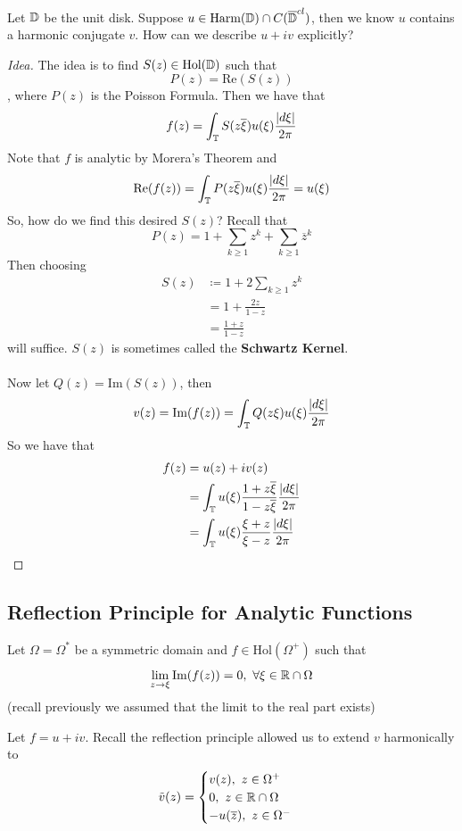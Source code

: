\documentclass{article}
\begin{document}
\begin{question}
    Let $\mathbb{D}$ be the unit disk. Suppose $u \in \text{Harm}(\mathbb{D}) \cap C(\overline{\mathbb{D}}^{cl})$, then we know $u$ contains a harmonic conjugate $v$. How can we describe $u + iv$ explicitly?
\end{question}

\begin{proof}[Idea]
The idea is to find $S(z) \in \text{Hol}(\mathbb{D})$ such that
\[P(z) = \text{Re}(S(z))\]
, where $P(z)$ is the Poisson Formula. Then we have that
\[f(z) = \int_{\mathbb{T}} S(z \overline{\xi}) u(\xi) \frac{|d\xi|}{2\pi}\]
Note that $f$ is analytic by Morera's Theorem and
\[\text{Re}(f(z)) = \int_{\mathbb{T}} P(z \overline{\xi}) u(\xi) \frac{|d\xi|}{2\pi} = u(\xi)\]
So, how do we find this desired $S(z)$? Recall that
\[P(z) = 1 + \sum_{k \geq 1} z^k + \sum_{k \geq 1} \overline{z}^k\]
Then choosing
\begin{align*}
    S(z) &\coloneqq 1 + 2 \sum_{k \geq 1} z^k\\
    &= 1 + \frac{2z}{1 - z} \tag*{Domain of $S(z)$ is $\Dbb$}\\
    &= \frac{1 + z}{1 - z}
\end{align*}
will suffice. $S(z)$ is sometimes called the \textbf{Schwartz Kernel}.\\\\
Now let $Q(z) = \text{Im}(S(z))$, then
\[v(z) = \text{Im}(f(z)) = \int_{\mathbb{T}} Q(z \xi) u(\xi) \frac{|d\xi|}{2\pi}\]
So we have that
\begin{align*}
    f(z) &= u(z) + i v(z)\\
    &= \int_{\mathbb{T}} u(\xi) \frac{1 + z \overline{\xi}}{1 - z \overline{\xi}} \frac{|d\xi|}{2\pi}\\
    &= \int_{\mathbb{T}} u(\xi) \frac{\xi + z}{\xi - z} \frac{|d\xi|}{2\pi}
\end{align*}
\end{proof}

\subsection{Reflection Principle for Analytic Functions}

Let $\Omega = \Omega^*$ be a symmetric domain and $f \in \text{Hol}(\Omega^+)$ such that
\[\lim_{z \to \xi} \text{Im}(f(z)) = 0,\ \forall \xi \in \mathbb{R} \cap \Omega\]
(recall previously we assumed that the limit to the real part exists) 

Let $f = u + iv$. Recall the reflection principle allowed us to extend $v$ harmonically to
\[\Tilde{v}(z) = \begin{cases}
    v(z),\ z \in \Omega^+\\
    0,\ z \in \mathbb{R} \cap \Omega\\
    -u(\overline{z}),\ z \in \Omega^-
\end{cases}\]
\end{document}

